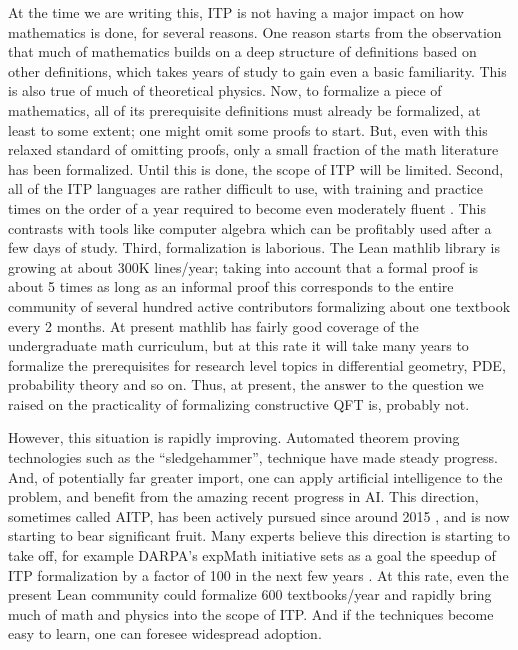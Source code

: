 \documentclass{article}
\newcommand{\SH}[2][blue]{\textcolor{#1}{\footnotesize\sf[#2]}}
\begin{document}
At the time we are writing this, ITP is not having a major impact on how mathematics is done, for several reasons.  One reason starts from the observation that much of mathematics builds on a deep structure of definitions based on other definitions, which takes years of study to gain even a basic familiarity.  This is also true of much of theoretical physics.  Now, to formalize a piece of mathematics, all of its prerequisite definitions must already be formalized, at least to some extent; one might omit some proofs to start.  But, even with this relaxed standard of omitting proofs, only a small fraction of the math literature has been formalized.  Until this is done, the scope of ITP will be limited.  Second, all of the ITP languages are rather difficult to use, with training and practice times on the order of a year required to become even moderately fluent \cite{}.    This contrasts with tools like computer algebra which can be profitably used after a few days of study.
Third, formalization is laborious.  The Lean mathlib library \cite{} 
is growing at about 300K lines/year; taking into account that a formal proof is about 5 times as long as an informal proof this corresponds to the entire community of several hundred active contributors formalizing about one textbook every 2 months.  At present mathlib has fairly good coverage of the undergraduate math curriculum, but at this rate it will take many years to formalize the prerequisites for research level topics in differential geometry, PDE, probability theory and so on.  Thus, at present, the answer to the question we raised on the practicality of formalizing constructive QFT is, probably not.

However, this situation is rapidly improving.  Automated theorem proving technologies such as the ``sledgehammer'', \SH{and interactive Lean MCP protocols} technique \cite{} have made steady progress.  And, of potentially far greater import, one can apply artificial intelligence to the problem, and benefit from the amazing recent progress in AI.   This direction, sometimes
called AITP, has been actively pursued since around 2015 \cite{}, and is now starting to bear significant fruit.
Many experts believe this direction is starting to  take off, for example DARPA's expMath initiative sets as a goal the speedup of ITP formalization by a factor of 100 in the next few years \cite{}.  At this rate, even the present Lean community could formalize 600 textbooks/year and rapidly bring much of math and physics into the scope of ITP.
And if the techniques become easy to learn, one can foresee widespread adoption.
\end{document}
